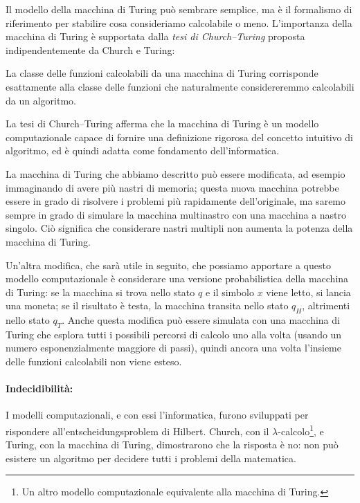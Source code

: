 Il modello della macchina di Turing può sembrare semplice, ma è il formalismo di riferimento per stabilire cosa consideriamo calcolabile o meno. L'importanza della macchina di Turing è supportata dalla \emph{tesi di Church–Turing} proposta indipendentemente da Church e Turing:
\begin{thesis}
	La classe delle funzioni calcolabili da una macchina di Turing corrisponde esattamente alla classe delle funzioni che naturalmente considereremmo calcolabili da un algoritmo.
\end{thesis}
La tesi di Church–Turing afferma che la macchina di Turing è un modello computazionale capace di fornire una definizione rigorosa del concetto intuitivo di algoritmo, ed è quindi adatta come fondamento dell'informatica.

La macchina di Turing che abbiamo descritto può essere modificata, ad esempio immaginando di avere più nastri di memoria; questa nuova macchina potrebbe essere in grado di risolvere i problemi più rapidamente dell'originale, ma saremo sempre in grado di simulare la macchina multinastro con una macchina a nastro singolo. Ciò significa che considerare nastri multipli non aumenta la potenza della macchina di Turing.

Un'altra modifica, che sarà utile in seguito, che possiamo apportare a questo modello computazionale è considerare una versione probabilistica della macchina di Turing: se la macchina si trova nello stato $q$ e il simbolo $x$ viene letto, si lancia una moneta; se il risultato è testa, la macchina transita nello stato $q_H$, altrimenti nello stato $q_T$. Anche questa modifica può essere simulata con una macchina di Turing che esplora tutti i possibili percorsi di calcolo uno alla volta (usando un numero esponenzialmente maggiore di passi), quindi ancora una volta l'insieme delle funzioni calcolabili non viene esteso.

\paragraph{Indecidibilità:} I modelli computazionali, e con essi l'informatica, furono sviluppati per rispondere all'entscheidungsproblem di Hilbert. Church, con il $\lambda$-calcolo\footnote{Un altro modello computazionale equivalente alla macchina di Turing.}, e Turing, con la macchina di Turing, dimostrarono che la risposta è no: non può esistere un algoritmo per decidere tutti i problemi della matematica.

